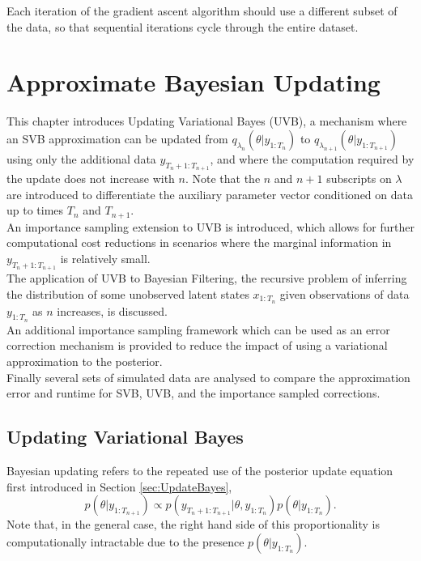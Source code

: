 \documentclass[
12pt, %
onehalfspacing, %
nohyperref, %
headsepline, %
chapterinoneline, %
]{MastersDoctoralThesis} %
\begin{document}
Each iteration of the gradient ascent algorithm should use a different subset of the data, so that sequential iterations cycle through the entire dataset. 
\\

\chapter{Approximate Bayesian Updating}
\label{chap:UVB}

This chapter introduces Updating Variational Bayes (UVB), a mechanism where an SVB approximation can be updated from $q_{\lambda_n}(\theta | y_{1:T_n})$ to  $q_{\lambda_{n+1}}(\theta | y_{1:T_{n+1}})$ using only the additional data $y_{T_{n}+1:T_{n+1}}$, and where the computation required by the update does not increase with $n$. Note that the $n$ and $n+1$ subscripts on $\lambda$ are introduced to differentiate the auxiliary parameter vector conditioned on data up to times $T_{n}$ and $T_{n+1}$.
\\

An importance sampling extension to UVB is introduced, which allows for further computational cost reductions in scenarios where the marginal information in $y_{T_n+1:T_{n+1}}$ is relatively small.
\\

The application of UVB to Bayesian Filtering, the recursive problem of inferring the distribution of some unobserved latent states $x_{1:T_n}$ given observations of data $y_{1:T_n}$ as $n$ increases, is discussed. 
\\

An additional importance sampling framework which can be used as an error correction mechanism is provided to reduce the impact of using a variational approximation to the posterior. 
\\

Finally several sets of simulated data are analysed to compare the approximation error and runtime for SVB, UVB, and the importance sampled corrections.

\section{Updating Variational Bayes}
\label{sec:UVB}

Bayesian updating refers to the repeated use of the posterior update equation first introduced in Section \ref{sec:UpdateBayes},
\begin{equation}
\label{UVB:updatePost}
p(\theta | y_{1:T_{n+1}}) \propto p(y_{T_{n}+1:T_{n+1}} | \theta, y_{1:T_{n}})p(\theta | y_{1:T_{n}}).
\end{equation}
Note that, in the general case, the right hand side of this proportionality is computationally intractable due to the presence $p(\theta | y_{1:T_n})$.
\\
\end{document}
